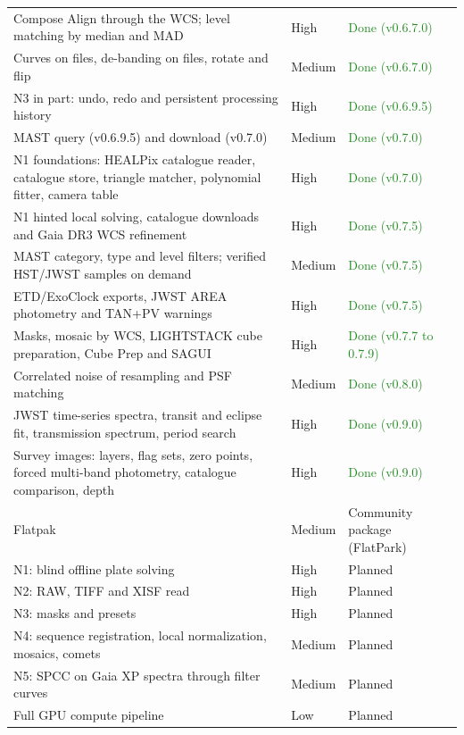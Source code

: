 \documentclass[11pt,a4paper]{article}
\begin{document}
\begin{longtable}{>{\raggedright\arraybackslash}p{8.4cm}ll}
            Compose Align through the WCS; level matching by median and MAD & High & \textcolor{ForestGreen}{Done (v0.6.7.0)} \\
            Curves on files, de-banding on files, rotate and flip & Medium & \textcolor{ForestGreen}{Done (v0.6.7.0)} \\
            N3 in part: undo, redo and persistent processing history & High & \textcolor{ForestGreen}{Done (v0.6.9.5)} \\
            MAST query (v0.6.9.5) and download (v0.7.0) & Medium & \textcolor{ForestGreen}{Done (v0.7.0)} \\
            N1 foundations: HEALPix catalogue reader, catalogue store, triangle matcher, polynomial fitter, camera table & High & \textcolor{ForestGreen}{Done (v0.7.0)} \\
            N1 hinted local solving, catalogue downloads and Gaia DR3 WCS refinement & High & \textcolor{ForestGreen}{Done (v0.7.5)} \\
            MAST category, type and level filters; verified HST/JWST samples on demand & Medium & \textcolor{ForestGreen}{Done (v0.7.5)} \\
            ETD/ExoClock exports, JWST AREA photometry and TAN+PV warnings & High & \textcolor{ForestGreen}{Done (v0.7.5)} \\
            Masks, mosaic by WCS, LIGHTSTACK cube preparation, Cube Prep and SAGUI & High & \textcolor{ForestGreen}{Done (v0.7.7 to 0.7.9)} \\
            Correlated noise of resampling and PSF matching & Medium & \textcolor{ForestGreen}{Done (v0.8.0)} \\
            JWST time-series spectra, transit and eclipse fit, transmission spectrum, period search & High & \textcolor{ForestGreen}{Done (v0.9.0)} \\
            Survey images: layers, flag sets, zero points, forced multi-band photometry, catalogue comparison, depth & High & \textcolor{ForestGreen}{Done (v0.9.0)} \\
            \midrule
            Flatpak & Medium & Community package (FlatPark) \\
            \midrule
            N1: blind offline plate solving & High & Planned \\
            N2: RAW, TIFF and XISF read & High & Planned \\
            N3: masks and presets & High & Planned \\
            N4: sequence registration, local normalization, mosaics, comets & Medium & Planned \\
            N5: SPCC on Gaia XP spectra through filter curves & Medium & Planned \\
            Full GPU compute pipeline & Low & Planned \\
    \end{longtable}
    \endgroup
\end{document}
